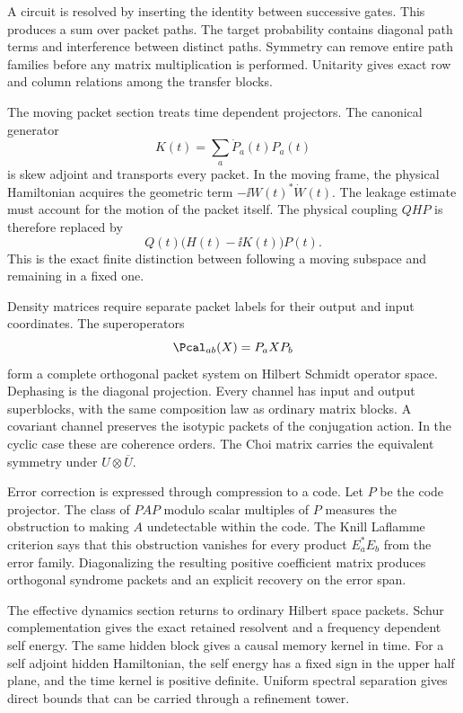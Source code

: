 A circuit is resolved by inserting the identity between successive gates. This produces a sum over packet paths. The target probability contains diagonal path terms and interference between distinct paths. Symmetry can remove entire path families before any matrix multiplication is performed. Unitarity gives exact row and column relations among the transfer blocks.

The moving packet section treats time dependent projectors. The canonical generator
\[
K(t)=\sum_a\dot P_a(t)P_a(t)
\]
is skew adjoint and transports every packet. In the moving frame, the physical Hamiltonian acquires the geometric term \(-\ii W(t)^*\dot W(t)\). The leakage estimate must account for the motion of the packet itself. The physical coupling \(QHP\) is therefore replaced by
\[
Q(t)\bigl(H(t)-\ii K(t)\bigr)P(t).
\]
This is the exact finite distinction between following a moving subspace and remaining in a fixed one.

Density matrices require separate packet labels for their output and input coordinates. The superoperators
\[
\Pcal_{ab}(X)=P_aXP_b
\]
form a complete orthogonal packet system on Hilbert Schmidt operator space. Dephasing is the diagonal projection. Every channel has input and output superblocks, with the same composition law as ordinary matrix blocks. A covariant channel preserves the isotypic packets of the conjugation action. In the cyclic case these are coherence orders. The Choi matrix carries the equivalent symmetry under \(U\otimes\overline U\).

Error correction is expressed through compression to a code. Let \(P\) be the code projector. The class of \(PAP\) modulo scalar multiples of \(P\) measures the obstruction to making \(A\) undetectable within the code. The Knill Laflamme criterion says that this obstruction vanishes for every product \(E_a^*E_b\) from the error family. Diagonalizing the resulting positive coefficient matrix produces orthogonal syndrome packets and an explicit recovery on the error span.

The effective dynamics section returns to ordinary Hilbert space packets. Schur complementation gives the exact retained resolvent and a frequency dependent self energy. The same hidden block gives a causal memory kernel in time. For a self adjoint hidden Hamiltonian, the self energy has a fixed sign in the upper half plane, and the time kernel is positive definite. Uniform spectral separation gives direct bounds that can be carried through a refinement tower.

